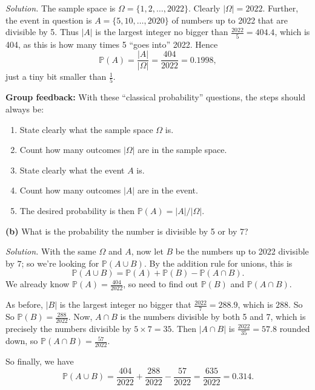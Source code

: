 \documentclass[
  a4paper,
]{book}
\providecommand{\tightlist}{%
  \setlength{\itemsep}{0pt}\setlength{\parskip}{0pt}}
\theoremstyle{definition}
\theoremstyle{definition}
\theoremstyle{definition}
\theoremstyle{definition}
\theoremstyle{remark}
\begin{document}
\begin{myanswers}

\emph{Solution.} The sample space is \(\Omega = \{1, 2, \dots, 2022\}\). Clearly \(|\Omega| = 2022\). Further, the event in question is \(A = \{5, 10, \dots, 2020\}\) of numbers up to 2022 that are divisible by 5. Thus \(|A|\) is the largest integer no bigger than \(\frac{2022}{5} = 404.4\), which is 404, as this is how many times 5 ``goes into'' 2022. Hence
\[ \mathbb P(A) = \frac{|A|}{|\Omega|} = \frac{404}{2022} = 0.1998 , \]
just a tiny bit smaller than \(\frac{1}{5}\).

\textbf{Group feedback:} With these ``classical probability'' questions, the steps should always be:

\begin{enumerate}
\def\labelenumi{\arabic{enumi}.}
\tightlist
\item
  State clearly what the sample space \(\Omega\) is.
\item
  Count how many outcomes \(|\Omega|\) are in the sample space.
\item
  State clearly what the event \(A\) is.
\item
  Count how many outcomes \(|A|\) are in the event.
\item
  The desired probability is then \(\mathbb P(A) = |A|/|\Omega|\).
\end{enumerate}

\end{myanswers}

\textbf{(b)} What is the probability the number is divisible by 5 or by 7?

\begin{myanswers}
\emph{Solution.} With the same \(\Omega\) and \(A\), now let \(B\) be the numbers up to 2022 divisible by \(7\); so we're looking for \(\mathbb P(A \cup B)\). By the addition rule for unions, this is
\[ \mathbb P(A \cup B) = \mathbb P(A) + \mathbb P(B) - \mathbb P(A \cap B) . \]
We already know \(\mathbb P(A) = \frac{404}{2022}\), so need to find out \(\mathbb P(B)\) and \(\mathbb P(A \cap B)\).

As before, \(|B|\) is the largest integer no bigger that \(\frac{2022}{7} = 288.9\), which is \(288\). So
So \(\mathbb P(B) = \frac{288}{2022}\).
Now, \(A \cap B\) is the numbers divisible by both 5 and 7, which is precisely the numbers divisible by \(5 \times 7 = 35\). Then \(|A \cap B|\) is \(\frac{2022}{35} = 57.8\) rounded down, so \(\mathbb P(A \cap B) = \frac{57}{2022}\).

So finally, we have
\[ \mathbb P(A \cup B) = \frac{404}{2022} + \frac{288}{2022} - \frac{57}{2022} = \frac{635}{2022} = 0.314. \]

\end{myanswers}
\end{document}
